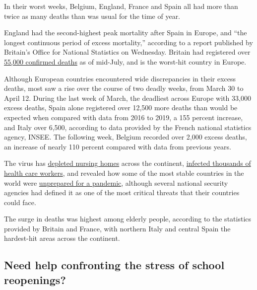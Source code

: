 In their worst weeks, Belgium, England, France and Spain all had more
than twice as many deaths than was usual for the time of year.

England had the second-highest peak mortality after Spain in Europe, and
``the longest continuous period of excess mortality,'' according to a
report published by Britain's Office for National Statistics on
Wednesday. Britain had registered over
\href{https://www.ons.gov.uk/peoplepopulationandcommunity/birthsdeathsandmarriages/deaths/datasets/weeklyprovisionalfiguresondeathsregisteredinenglandandwales}{55,000
confirmed deaths} as of mid-July, and is the worst-hit country in
Europe.

Although European countries encountered wide discrepancies in their
excess deaths, most saw a rise over the course of two deadly weeks, from
March 30 to April 12. During the last week of March, the deadliest
across Europe with 33,000 excess deaths, Spain alone registered over
12,500 more deaths than would be expected when compared with data from
2016 to 2019, a 155 percent increase, and Italy over 6,500, according to
data provided by the French national statistics agency, INSEE. The
following week, Belgium recorded over 2,000 excess deaths, an increase
of nearly 110 percent compared with data from previous years.

The virus has
\href{https://www.nytimes3xbfgragh.onion/2020/03/25/world/europe/Spain-coronavirus-nursing-homes.html}{depleted
nursing homes} across the continent,
\href{https://www.nytimes3xbfgragh.onion/2020/03/03/world/europe/coronavirus-health-workers-uk.html}{infected
thousands of health care workers}, and revealed how some of the most
stable countries in the world were
\href{https://www.nytimes3xbfgragh.onion/2020/07/20/world/europe/coronavirus-mistakes-france-uk-italy.html}{unprepared
for a pandemic}, although several national security agencies had defined
it as one of the most critical threats that their countries could face.

The surge in deaths was highest among elderly people, according to the
statistics provided by Britain and France, with northern Italy and
central Spain the hardest-hit areas across the continent.

\hypertarget{need-help-confronting-the-stress-of-school-reopenings}{%
\subsection{Need help confronting the stress of school
reopenings?}\label{need-help-confronting-the-stress-of-school-reopenings}}

